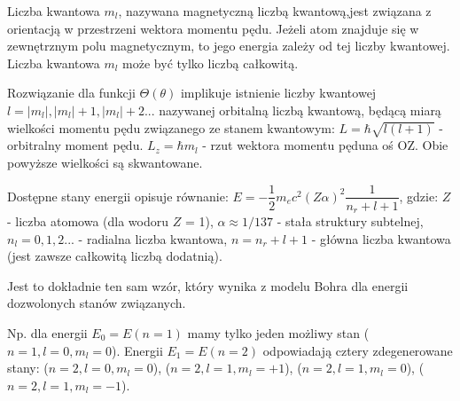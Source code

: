 Liczba kwantowa $ m_l $, nazywana magnetyczną liczbą kwantową,jest związana z orientacją w przestrzeni wektora momentu pędu. Jeżeli atom znajduje się w zewnętrznym polu magnetycznym, to jego energia zależy od tej liczby kwantowej. Liczba kwantowa $ m_l $ może być tylko liczbą całkowitą. 

Rozwiązanie dla funkcji $ \Theta(\theta) $ implikuje istnienie liczby kwantowej $ l = |m_l|, |m_l|+1, |m_l|+2 ... $ nazywanej orbitalną liczbą kwantową, będącą miarą wielkości momentu pędu związanego ze stanem kwantowym: \newline
$ L = \hbar \sqrt{l(l+1)} $ - orbitralny moment pędu.\newline
$ L_z = \hbar m_l $ - rzut wektora momentu pęduna oś OZ.\newline
Obie powyższe wielkości są skwantowane.

Dostępne stany energii opisuje równanie:\newline
$ E = -\dfrac{1}{2} m_e c^2 (Z\alpha)^2 \dfrac{1}{n_r + l + 1} $, gdzie:\newline
$ Z $ - liczba atomowa (dla wodoru $ Z $ = 1),\newline
$ \alpha \approx 1/137 $ - stała struktury subtelnej,\newline
$ n_l = 0, 1, 2 ... $ - radialna liczba kwantowa,\newline
$ n = n_r + l + 1 $ - główna liczba kwantowa (jest zawsze całkowitą liczbą dodatnią).

Jest to dokładnie ten sam wzór, który wynika z modelu Bohra dla energii dozwolonych stanów związanych.

Np. dla energii $ E_0 = E(n = 1) $ mamy tylko jeden możliwy stan ($n = 1, l = 0, m_l = 0$). Energii $ E_1 = E(n = 2) $ odpowiadają cztery zdegenerowane stany:\newline
($n = 2, l = 0, m_l = 0$),\newline
($n = 2, l = 1, m_l = +1$),\newline
($n = 2, l = 1, m_l = 0$),\newline
($n = 2, l = 1, m_l = -1$).